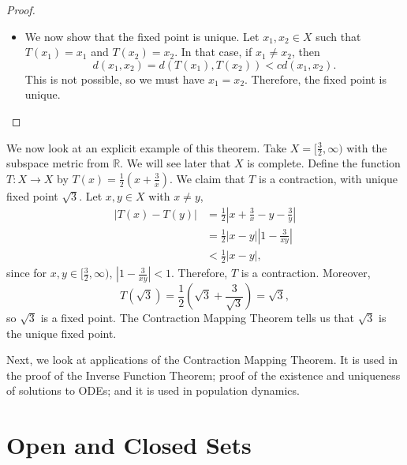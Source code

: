 \documentclass[a4paper, openany]{memoir}
\theoremstyle{definition}
\theoremstyle{plain}
\begin{document}
\begin{proof}
\begin{itemize}
    \item We now show that the fixed point is unique. Let $x_1, x_2 \in X$ such that $T(x_1) = x_1$ and $T(x_2) = x_2$. In that case, if $x_1 \neq x_2$, then
    \[d(x_1, x_2) = d(T(x_1), T(x_2)) < cd(x_1, x_2).\]
    This is not possible, so we must have $x_1 = x_2$. Therefore, the fixed point is unique.
\end{itemize}
\end{proof}
\noindent We now look at an explicit example of this theorem. Take $X = [\frac{3}{2}, \infty)$ with the subspace metric from $\mathbb{R}$. We will see later that $X$ is complete. Define the function $T: X \to X$ by $T(x) = \frac{1}{2}(x + \frac{3}{x})$. We claim that $T$ is a contraction, with unique fixed point $\sqrt{3}$. Let $x, y \in X$ with $x \neq y$,
\begin{align*}
    |T(x) - T(y)| &= \frac{1}{2} \left|x + \frac{3}{x}  - y - \frac{3}{y}\right| \\
    &= \frac{1}{2}|x-y| \left|1 - \frac{3}{xy}\right| \\
    &< \frac{1}{2}|x-y|,
\end{align*}
since for $x, y \in [\frac{3}{2}, \infty)$, $|1 - \frac{3}{xy}| < 1$. Therefore, $T$ is a contraction. Moreover,
\[T(\sqrt{3}) = \frac{1}{2} \left(\sqrt{3} + \frac{3}{\sqrt{3}}\right) = \sqrt{3},\]
so $\sqrt{3}$ is a fixed point. The Contraction Mapping Theorem tells us that $\sqrt{3}$ is the unique fixed point.

Next, we look at applications of the Contraction Mapping Theorem. It is used in the proof of the Inverse Function Theorem; proof of the existence and uniqueness of solutions to ODEs; and it is used in population dynamics.

\newpage

\section{Open and Closed Sets}
\end{document}
